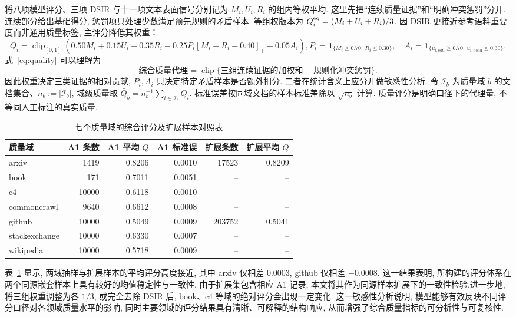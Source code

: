 将八项模型评分、三项 DSIR 与十一项文本表面信号分别记为 $M_i, U_i, R_i$ 的组内等权平均. 这里先把“连续质量证据”和“明确冲突惩罚”分开. 连续部分给出基础得分, 惩罚项只处理少数满足预先规则的矛盾样本. 等组权版本为 $Q_i^{\rm eq}=(M_i+U_i+R_i)/3$. 因 DSIR 更接近参考语料重要度而非通用质量标签, 主评分降低其权重：
\begin{subequations}\label{eq:quality}
   \begin{equation}
           Q_i=\operatorname{clip}_{[0, 1]}\left(0.50M_i+0.15U_i+0.35R_i-0.25P_i[M_i-R_i-0.40]_+-0.05A_i\right), 
   \end{equation}
   \begin{equation}
        P_i=\mathbf 1_{\{M_i\ge0.70, \ R_i\le0.30\}}, \quad A_i=\mathbf 1_{\{u_{i, \mathrm{edu}}\ge0.70, \ u_{i, \mathrm{noad}}\le0.30\}}.
   \end{equation}
\end{subequations}
式~\eqref{eq:quality} 可以理解为
\[
\text{综合质量代理}=\operatorname{clip}\{\text{三组连续证据的加权和}-\text{规则化冲突惩罚}\}.
\]
因此权重决定三类证据的相对贡献, $P_i, A_i$ 只决定特定矛盾样本是否额外扣分. 二者在统计含义上应分开做敏感性分析. 令 $\mathcal I_b$ 为质量域 $b$ 的文档集合、$n_b:=|\mathcal I_b|$, 域级质量取 $\bar Q_b=n_b^{-1}\sum_{i\in\mathcal I_b}Q_i$. 标准误差按同域文档的样本标准差除以 $\sqrt{n_b}$ 计算. 质量评分是明确口径下的代理量, 不等同人工标注的真实质量. 

\begin{table}[H]\centering\small
\caption{七个质量域的综合评分及扩展样本对照表}\label{tab:q}
\begin{tabular}{lrrrrr}\toprule
质量域 & A1 条数 & A1 平均 $Q$ & A1 标准误 & 扩展条数 & 扩展平均 $Q$\\\midrule
arxiv & 1419 & 0.8206 & 0.0010 & 17523 & 0.8209\\
book & 171 & 0.7011 & 0.0051 & -- & --\\
c4 & 10000 & 0.6118 & 0.0010 & -- & --\\
commoncrawl & 9640 & 0.6612 & 0.0008 & -- & --\\
github & 10000 & 0.5049 & 0.0009 & 203752 & 0.5041\\
stackexchange & 10000 & 0.6330 & 0.0007 & -- & --\\
wikipedia & 10000 & 0.5718 & 0.0009 & -- & --\\\bottomrule
\end{tabular}
\end{table}

表~\ref{tab:q} 显示,  两域抽样与扩展样本的平均评分高度接近,  其中 arxiv 仅相差 $0.0003$,  github 仅相差 $-0.0008$. 这一结果表明,  所构建的评分体系在两个同源嵌套样本上具有较好的均值稳定性与一致性. 由于扩展集包含相应 A1 记录,  本文将其作为同源样本扩展下的一致性检验.进一步地,  将三组权重调整为各 $1/3$,  或完全去除 DSIR 后,  book、c4 等域的绝对评分会出现一定变化. 这一敏感性分析说明,  模型能够有效反映不同评分口径对各领域质量水平的影响,  同时主要领域的评分结果具有清晰、可解释的结构响应,  从而增强了综合质量指标的可分析性与可复核性.


